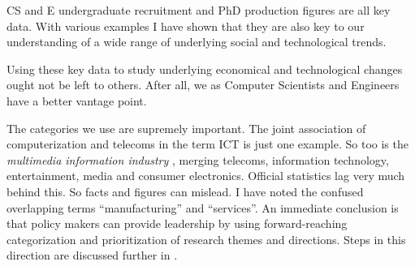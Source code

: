 \documentclass{article}
\begin{document}
CS and E undergraduate recruitment and PhD production figures are 
all key data.  With various examples I have shown that they are 
also key to our understanding of a wide 
range of underlying social and technological trends.  



Using these key data to study underlying economical and technological 
changes ought not be left to others.  After all, we as 
Computer Scientists and Engineers have a better vantage point.  

The categories we use are supremely important.  The joint association of
computerization and telecoms in the term ICT is just one example.  
So too is the {\em multimedia information industry} \cite{pennings},
merging telecoms, information technology, entertainment, media and
consumer electronics.  
Official statistics lag very much behind this.  So facts and figures can 
mislead.  I have noted the confused overlapping terms ``manufacturing'' 
and ``services''.  An immediate conclusion is that policy makers can provide
leadership by using forward-reaching categorization and prioritization
 of research themes and directions.  
Steps in this direction are discussed further in \cite{boole}.  
\end{document}

